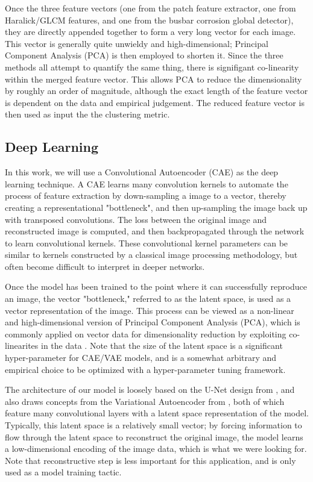 \documentclass[conference]{IEEEtran}
\begin{document}
Once the three feature vectors (one from the patch feature extractor, one from Haralick/GLCM features, and one from the busbar corrosion global detector), they are directly appended together to form a very long vector for each image. 
This vector is generally quite unwieldy and high-dimensional; Principal Component Analysis (PCA) is then employed to shorten it. 
Since the three methods all attempt to quantify the same thing, there is signifigant co-linearity within the merged feature vector. 
This allows PCA to reduce the dimensionality by roughly an order of magnitude, although the exact length of the feature vector is dependent on the data and empirical judgement. 
The reduced feature vector is then used as input the the clustering  metric. 

\subsection{Deep Learning}
In this work, we will use a Convolutional Autoencoder (CAE) as the deep learning technique. 
A CAE learns many convolution kernels to automate the process of feature extraction by down-sampling a image to a vector, thereby creating a representational "bottleneck", and then up-sampling the image back up with transposed convolutions. 
The loss between the original image and reconstructed image is computed, and then backpropagated through the network to learn convolutional kernels. 
These convolutional kernel parameters can be similar to kernels constructed by a classical image processing methodology, but often become difficult to interpret in deeper networks. 

Once the model has been trained to the point where it can successfully reproduce an image, the vector "bottleneck," referred to as the latent space, is used as a vector representation of the image. 
This process can be viewed as a non-linear and high-dimensional version of Principal Component Analysis (PCA), which is commonly applied on vector data for dimensionality reduction by exploiting co-linearites in the data \cite{kramer_nonlinear_1991}. 
Note that the size of the latent space is a significant hyper-parameter for CAE/VAE models, and is a somewhat arbitrary and empirical choice to be optimized with a hyper-parameter tuning framework. 

The architecture of our model is loosely based on the U-Net design from \cite{DBLP:journals/corr/RonnebergerFB15}, and also draws concepts from the Variational Autoencoder from \cite{Subramanian2020}, both of which feature many convolutional layers with a latent space representation of the model. 
Typically, this latent space is a relatively small vector; by forcing information to flow through the latent space to reconstruct the original image, the model learns a low-dimensional encoding of the image data, which is what we were looking for. 
Note that reconstructive step is less important for this application, and is only used as a model training tactic. 
\end{document}
